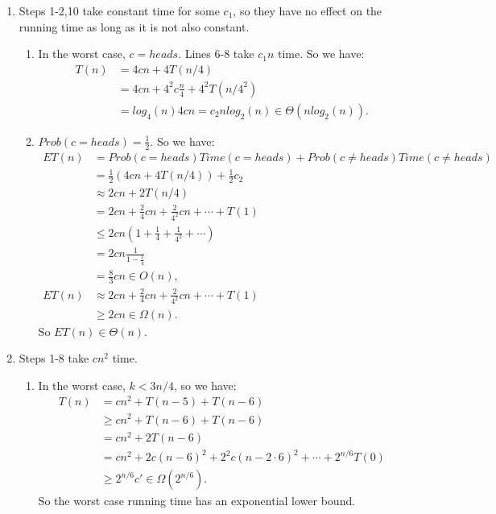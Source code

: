 \documentclass[10pt,oneside,reqno]{amsart}
\theoremstyle{plain}
\theoremstyle{definition}
\begin{document}
\begin{enumerate}[label=\arabic*.]
\item Steps 1-2,10 take constant time for some $c_1$, so they have no effect on the running time as long as it is not also constant.  
\begin{enumerate}
\item In the worst case, $c = heads$. Lines 6-8 take $c_1n$ time. So we have:
\begin{equation}
\begin{aligned}
T(n) &= 4cn + 4T(n/4)\\
&= 4cn + 4^2c\frac{n}{4} + 4^2T(n/4^2)\\
&= log_4(n)4cn = c_2nlog_2(n) \in \Theta(nlog_2(n)). 
\end{aligned}
\end{equation}
\item $Prob(c = heads) = \frac{1}{2}$. So we have:
\begin{equation}
\begin{aligned}
ET(n) &= Prob(c = heads)Time(c = heads) + Prob(c \neq heads)Time(c\neq heads)\\
&= \frac{1}{2}(4cn + 4T(n/4)) + \frac{1}{2}c_2\\
&\approx 2cn + 2T(n/4)\\
&= 2cn + \frac{2}{4}cn + \frac{2}{4^2}cn + \cdots + T(1)\\
&\leq 2cn\left(1 + \frac{1}{4} + \frac{1}{4^2} + \cdots \right)\\
&= 2cn\frac{1}{1 - \frac{1}{4}}\\
&= \frac{8}{3}cn \in O(n),\\
ET(n) &\approx 2cn + \frac{2}{4}cn + \frac{2}{4^2}cn + \cdots + T(1)\\
&\geq 2cn \in \Omega(n). 
\end{aligned}
\end{equation}
So $ET(n) \in \Theta(n)$. \\
\end{enumerate}
\item Steps 1-8 take $cn^2$ time. 
\begin{enumerate}
\item In the worst case, $k < 3n/4$, so we have: 
\begin{equation}
\begin{aligned}
T(n) &= cn^2 + T(n - 5) + T(n -6)\\
&\geq cn^2 + T(n - 6) + T(n  -6)\\
&= cn^2 + 2T(n - 6)\\
&= cn^2 + 2c(n - 6)^2 + 2^2c(n - 2\cdot 6)^2 + \cdots + 2^{n/6}T(0)\\
&\geq 2^{n/6}c' \in \Omega(2^{n/6}). 
\end{aligned}
\end{equation}
So the worst case running time has an exponential lower bound. 


\end{enumerate}
\end{enumerate}
\end{document}
